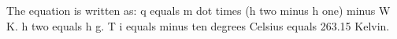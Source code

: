 The equation is written as:  
q equals m dot times (h two minus h one) minus W K.  
h two equals h g.  
T i equals minus ten degrees Celsius equals 263.15 Kelvin.
